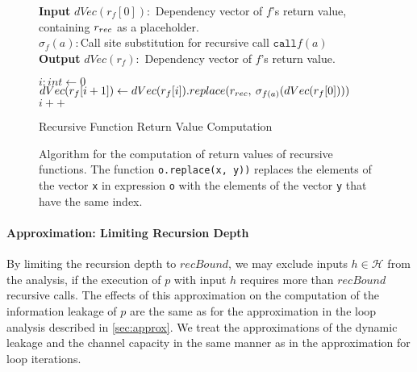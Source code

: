 \begin{figure}
    \centering
    \begin{algorithm}[H]
    \hspace*{\algorithmicindent} \textbf{Input} $dVec(r_f[0]):$ Dependency vector of $f$'s return value, \\
    \hspace*{\algorithmicindent} \hspace*{\algorithmicindent} containing $r_{rec}$ as a placeholder.\\
    \hspace*{\algorithmicindent} \hspace*{\algorithmicindent} $\sigma_f(a): $Call site substitution for recursive call $\mathtt{call} f(a)$ \\
    \hspace*{\algorithmicindent} \textbf{Output} $dVec(r_f):$ Dependency vector of $f$'s return value.\\
    
    \begin{algorithmic}[1]
        \State $i: int \leftarrow 0$
            \State $dVec(r_f[i + 1]) \leftarrow dVec(r_f[i]).replace(r_{rec}, \: \sigma_{f(a)}(dVec(r_f[0])))$
            \State $i++$
        \EndWhile
        \end{algorithmic}
\caption{Recursive Function Return Value Computation}
\end{algorithm}
    \caption{Algorithm for the computation of return values of recursive functions. The function \texttt{o.replace(x, y))} replaces the elements of the vector \texttt{x} in expression \texttt{o} with the elements of the vector \texttt{y} that have the same index.}\label{alg:rec}
\end{figure}

\paragraph{Approximation: Limiting Recursion Depth}
By limiting the recursion depth to $recBound$, we may exclude inputs $h \in \mathcal{H}$ from the analysis, if the execution of $p$ with input $h$ requires more than $recBound$ recursive calls. The effects of this approximation on the computation of the information leakage of $p$ are the same as for the approximation in the loop analysis described in \ref{sec:approx}. We treat the approximations of the dynamic leakage and the channel capacity in the same manner as in the approximation for loop iterations.


